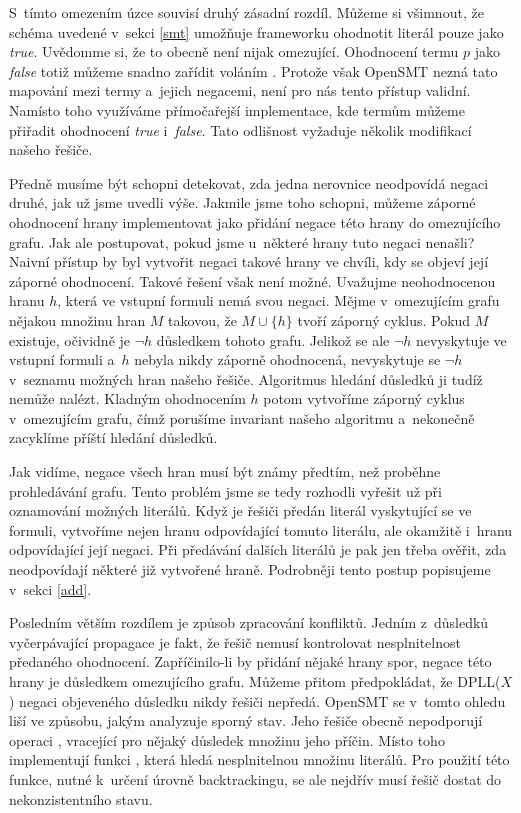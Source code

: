 S~tímto omezením úzce souvisí druhý zásadní rozdíl. Můžeme si všimnout, že schéma uvedené v~sekci \ref{smt} umožňuje frameworku ohodnotit literál pouze jako \emph{true}. Uvědomme si, že to obecně není nijak omezující. Ohodnocení termu $p$ jako \emph{false} totiž můžeme snadno zařídit voláním . Protože však OpenSMT nezná tato mapování mezi termy a~jejich negacemi, není pro nás tento přístup validní. Namísto toho využíváme přímočařejší implementace, kde termům můžeme přiřadit ohodnocení \emph{true} i~\emph{false}. Tato odlišnost vyžaduje několik modifikací našeho řešiče. 

Předně musíme být schopni detekovat, zda jedna nerovnice neodpovídá negaci druhé, jak už jsme uvedli výše. Jakmile jsme toho schopni, můžeme záporné ohodnocení hrany implementovat jako přidání negace této hrany do omezujícího grafu. Jak ale postupovat, pokud jsme u~některé hrany tuto negaci nenašli? Naivní přístup by byl vytvořit negaci takové hrany ve chvíli, kdy se objeví její záporné ohodnocení. Takové řešení však není možné. Uvažujme neohodnocenou hranu $h$, která ve vstupní formuli nemá svou negaci. Mějme v~omezujícím grafu nějakou množinu hran $M$ takovou, že $M \cup \{h\}$ tvoří záporný cyklus. Pokud $M$ existuje, očividně je $\neg h$ důsledkem tohoto grafu. Jelikož se ale $\neg h$ nevyskytuje ve vstupní formuli a~$h$ nebyla nikdy záporně ohodnocená, nevyskytuje se $\neg h$ v~seznamu možných hran našeho řešiče. Algoritmus hledání důsledků ji tudíž nemůže nalézt. Kladným ohodnocením $h$ potom vytvoříme záporný cyklus v~omezujícím grafu, čímž porušíme invariant našeho algoritmu a~nekonečně zacyklíme příští hledání důsledků.

Jak vidíme, negace všech hran musí být známy předtím, než proběhne prohledávání grafu. Tento problém jsme se tedy rozhodli vyřešit už při oznamování možných literálů. Když je řešiči předán literál vyskytující se ve formuli, vytvoříme nejen hranu odpovídající tomuto literálu, ale okamžitě i~hranu odpovídající její negaci. Při předávání dalších literálů je pak jen třeba ověřit, zda neodpovídají některé již vytvořené hraně. Podrobněji tento postup popisujeme v~sekci \ref{add}.

Posledním větším rozdílem je způsob zpracování konfliktů. Jedním z~důsledků vyčerpávající propagace je fakt, že řešič nemusí kontrolovat nesplnitelnost předaného ohodnocení. Zapříčinilo-li by přidání nějaké hrany spor, negace této hrany je důsledkem omezujícího grafu. Můžeme přitom předpokládat, že DPLL($X$) negaci objeveného důsledku nikdy řešiči nepředá. OpenSMT se v~tomto ohledu liší ve způsobu, jakým analyzuje sporný stav. Jeho řešiče obecně nepodporují operaci , vracející pro nějaký důsledek množinu jeho příčin. Místo toho implementují funkci , která hledá nesplnitelnou množinu literálů. Pro použití této funkce, nutné k~určení úrovně backtrackingu, se ale nejdřív musí řešič dostat do nekonzistentního stavu.

